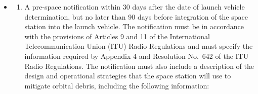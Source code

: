 \documentclass[
  letterpaper,
  DIV=11,
  numbers=noendperiod]{scrreport}
\providecommand{\tightlist}{%
  \setlength{\itemsep}{0pt}\setlength{\parskip}{0pt}}\usepackage{longtable,booktabs,array}
\begin{document}
\begin{itemize}
\item
  \begin{enumerate}
  \def\labelenumi{(\arabic{enumi})}
  \tightlist
  \item
    A pre-space notification within 30 days after the date of launch
    vehicle determination, but no later than 90 days before integration
    of the space station into the launch vehicle. The notification must
    be in accordance with the provisions of Articles 9 and 11 of the
    International Telecommunication Union (ITU) Radio Regulations and
    must specify the information required by Appendix 4 and Resolution
    No.~642 of the ITU Radio Regulations. The notification must also
    include a description of the design and operational strategies that
    the space station will use to mitigate orbital debris, including the
    following information:
  \end{enumerate}


\end{itemize}
\end{document}
